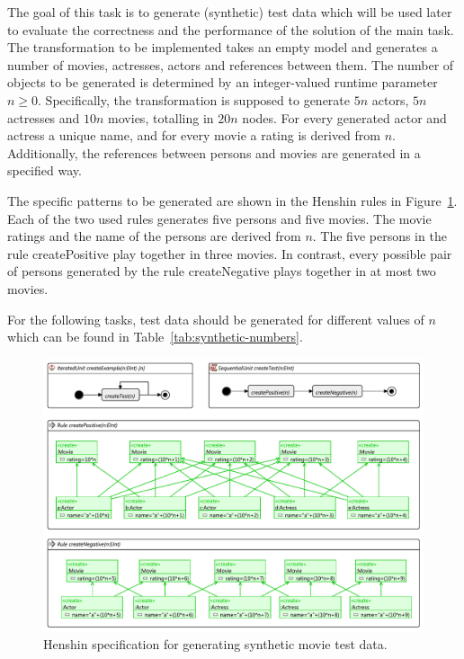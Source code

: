 \documentclass[a4paper,11pt]{article}
\begin{document}
The goal of this task is to generate (synthetic) test data which will be used
later to evaluate the correctness and the performance of the solution of the 
main task. The transformation to be implemented takes an empty model and 
generates a number of movies, actresses, actors and references between them.
The number of objects to be generated is determined by an integer-valued 
runtime parameter $n\geq0$. Specifically, the transformation is supposed
to generate $5n$ actors, $5n$ actresses and $10n$ movies, totalling in 
$20n$ nodes. For every generated actor and actress a unique name, and for 
every movie a rating is derived from $n$. Additionally, the references between
persons and movies are generated in a specified way.

The specific patterns to be generated are shown in the Henshin rules in
Figure~\ref{fig:gen-test-data}. Each of the two used rules generates five
persons and five movies. The movie ratings and the name of the persons are
derived from $n$. The five persons in the rule \textsf{createPositive} play
together in three movies. In contrast,
every possible pair of persons generated by the rule \textsf{createNegative}
plays together in at most two movies.

For the following tasks, test data should be generated for different values 
of $n$ which can be found in Table~\ref{tab:synthetic-numbers}.


\begin{figure}[p]
\centering
\includegraphics[scale=1.0,angle=90]{gen-test-data3}
\caption{Henshin specification for generating synthetic movie test data.}
\label{fig:gen-test-data}
\end{figure}
\end{document}
